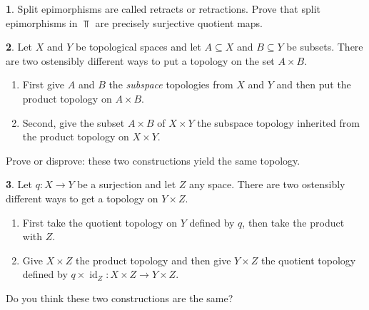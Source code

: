 \documentclass[11pt]{article}
\theoremstyle{definition}
\newtheorem{problem}{}
\newcommand{\bp}{\begin{problem}}
\newcommand{\ep}{\end{problem}\bigskip}
\theoremstyle{theorem}
\DeclareMathOperator{\id}{id}
\begin{document}
\bp Split epimorphisms are called retracts or retractions.  Prove that split epimorphisms in $\Top$ are precisely surjective quotient maps.
\ep


\begin{problem} Let $X$ and $Y$ be topological spaces and let $A\subseteq X$ and $B\subseteq Y$ be subsets.  There are two ostensibly different ways to put a topology on the set $A\times B$.

\begin{enumerate}[label=(\alph*)]
\item First give $A$ and $B$ the \emph{subspace} topologies from $X$ and $Y$ and then put the product topology on $A\times B$. 
\item Second, give the subset $A\times B$ of $X\times Y$ the subspace topology inherited from the product topology on $X\times Y$.
\end{enumerate}
Prove or disprove:  these two constructions yield the same topology.
\end{problem}

\begin{problem}Let $q:X\to Y$ be a surjection and let $Z$ any space.  There are two ostensibly different ways to get a topology on $Y\times Z$.  
\begin{enumerate}[label=(\alph*)]
\item First take the quotient topology on $Y$ defined by $q$, then take the product with $Z$.
\item Give $X\times Z$ the product topology and then give $Y\times Z$ the quotient topology defined by $q\times \id_Z:X \times Z \to Y \times Z.$
\end{enumerate}

Do you think these two constructions are the same?
\end{problem}
\end{document}
